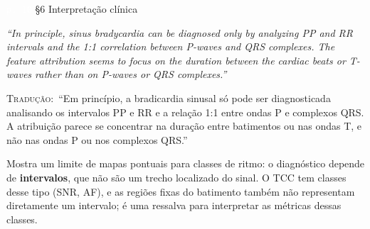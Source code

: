 \documentclass[11pt,a4paper]{article}
\newcommand{\pagechip}[1]{{\setlength{\fboxsep}{1.5pt}\colorbox{cAcc}{\textcolor{white}{\scriptsize\texttt{#1}}}}}
\newenvironment{origquote}{\par\itshape\small}{\par}
\newenvironment{tradquote}{\par\small\textsc{Tradução:}\ }{\par}
\newcommand{\explab}[1]{\par\smallskip{\small\color{cAcc}\textbf{\MakeUppercase{#1}}}\par}
\begin{document}
\begin{citacard}{\pagechip{p. 10} §6 Interpretação clínica}
\begin{origquote}“In principle, sinus bradycardia can be diagnosed only by analyzing PP and RR intervals and the 1:1 correlation between P-waves and QRS complexes. The feature attribution seems to focus on the duration between the cardiac beats or T-waves rather than on P-waves or QRS complexes.”\end{origquote}
\begin{tradquote}“Em princípio, a bradicardia sinusal só pode ser diagnosticada analisando os intervalos PP e RR e a relação 1:1 entre ondas P e complexos QRS. A atribuição parece se concentrar na duração entre batimentos ou nas ondas T, e não nas ondas P ou nos complexos QRS.”\end{tradquote}
\explab{Explicação}
Mostra um limite de mapas pontuais para classes de ritmo: o diagnóstico depende de \textbf{intervalos}, que não são um trecho localizado do sinal. O TCC tem classes desse tipo (SNR, AF), e as regiões fixas do batimento também não representam diretamente um intervalo; é uma ressalva para interpretar as métricas dessas classes.
\end{citacard}
\end{document}
